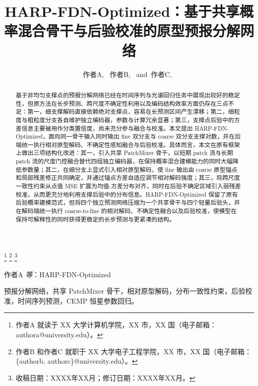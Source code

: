 \documentclass[journal]{IEEEtran}
\begin{document}
\title{HARP-FDN-Optimized：基于共享概率混合骨干与后验校准的原型预报分解网络}

\author{作者A,~
        作者B,~
        and~作者C,~}
\thanks{作者A 就读于 XX 大学计算机学院，XX 市，XX 国（电子邮箱：authora@university.edu）。}
\thanks{作者B 和作者C 就职于 XX 大学电子工程学院，XX 市，XX 国（电子邮箱：\{authorb, authorc\}@university.edu）。}
\thanks{收稿日期：XXXX年XX月；修订日期：XXXX年XX月。}

%
{作者A \MakeLowercase{\textit{等}}：HARP-FDN-Optimized}

\begin{abstract}
基于非均匀支撑点的预报分解网络已经在时间序列与光谱回归任务中展现出较好的稳定性，但原方法在长步预测、跨尺度不确定性利用以及编码结构效率方面仍存在三点不足：第一，细支撑解码直接依赖绝对支撑点，容易在长预测区间产生漂移；第二，细粒度与粗粒度分支各自维护独立编码器，参数与计算冗余显著；第三，支撑点后验中的方差信息主要被用作分类置信度，尚未充分参与融合与校准。本文提出 HARP-FDN-Optimized，面向同一骨干输入同时输出 fine 双分支与 coarse 双分支支撑对数，并在后端统一执行相对原型解码、不确定性感知融合与后验校准。具体而言，本文在原有框架上做出三项结构化改进：其一，引入共享 PatchMixer 骨干，以短期 patch 流与长期 patch 流的尺度门控融合替代四组独立编码器，在保持概率混合建模能力的同时大幅降低参数量；其二，在细分支上显式引入相对原型解码，使 fine 输出由 coarse 原型锚点和局部残差修正共同确定，并通过锚点方差自适应调节相对解码强度；其三，将跨尺度一致性约束从点值 MSE 扩展为均值-方差分布对齐，同时在后验不确定区域引入弱残差校准，从而更充分地利用支撑后验中的分布信息。HARP-FDN-Optimized 保留了原有后验概率建模范式，但将四个独立预测网络压缩为一个共享骨干与四个轻量后验头，并在解码端统一执行 coarse-to-fine 的相对解码、不确定性融合以及后验校准，使模型在保持可解释性的同时获得更稳定的长步预测与更紧凑的结构。
\end{abstract}

\begin{IEEEkeywords}
预报分解网络，共享 PatchMixer 骨干，相对原型解码，分布一致性约束，后验校准，时间序列预测，CEMP 恒星参数回归。
\end{IEEEkeywords}
\end{document}
